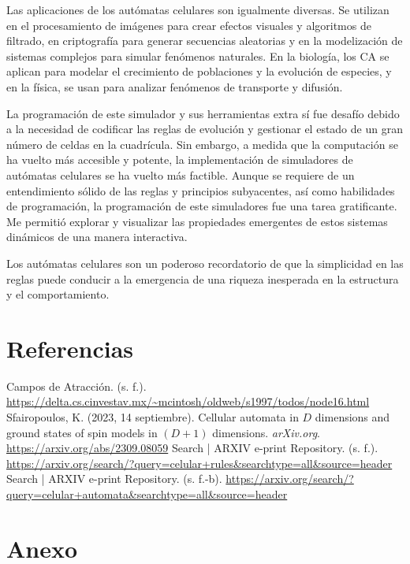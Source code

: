 \documentclass{article}
\begin{document}
	Las aplicaciones de los autómatas celulares son igualmente diversas. Se utilizan en el procesamiento de imágenes para crear efectos visuales y algoritmos de filtrado, en criptografía para generar secuencias aleatorias y en la modelización de sistemas complejos para simular fenómenos naturales. En la biología, los CA se aplican para modelar el crecimiento de poblaciones y la evolución de especies, y en la física, se usan para analizar fenómenos de transporte y difusión.
	
	La programación de este simulador y sus herramientas extra sí fue desafío debido a la necesidad de codificar las reglas de evolución y gestionar el estado de un gran número de celdas en la cuadrícula. Sin embargo, a medida que la computación se ha vuelto más accesible y potente, la implementación de simuladores de autómatas celulares se ha vuelto más factible. Aunque se requiere de un entendimiento sólido de las reglas y principios subyacentes, así como habilidades de programación, la programación de este simuladores fue una tarea gratificante. Me permitió explorar y visualizar las propiedades emergentes de estos sistemas dinámicos de una manera interactiva.
	
	Los autómatas celulares son un poderoso recordatorio de que la simplicidad en las reglas puede conducir a la emergencia de una riqueza inesperada en la estructura y el comportamiento.
	
\section{Referencias}

\begin{thebibliography}{}
	 Campos de Atracción. (s. f.). \url{https://delta.cs.cinvestav.mx/~mcintosh/oldweb/s1997/todos/node16.html}
	 Sfairopoulos, K. (2023, 14 septiembre). Cellular automata in $D$ dimensions and ground states of spin models in $(D+1)$ dimensions. \textit{arXiv.org}. \url{https://arxiv.org/abs/2309.08059}
	 Search | ARXIV e-print Repository. (s. f.). \url{https://arxiv.org/search/?query=celular+rules&searchtype=all&source=header}
	 Search | ARXIV e-print Repository. (s. f.-b). \url{https://arxiv.org/search/?query=celular+automata&searchtype=all&source=header}
\end{thebibliography}
	
	
	
	\vspace{100pt}
	\section{Anexo}
	
\end{document}
